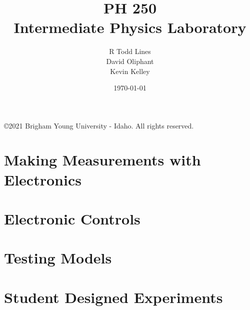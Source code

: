 \documentclass{book}
\title{{\Huge PH 250}\\
{\Huge {\Large Intermediate Physics Laboratory}}}
\author{R Todd Lines\\David Oliphant\\Kevin Kelley}
\date{\today}
\begin{document}
\frontmatter
\maketitle
\vspace*{\fill}
\copyright 2021 Brigham Young University - Idaho. All rights reserved.
\tableofcontents
\listoffigures




\mainmatter

\part{Making Measurements with Electronics}
	
	
	
	

\part{Electronic Controls}
	

\part{Testing Models}
	
	
	
	


\part{Student Designed Experiments}
	
			
\end{document}

